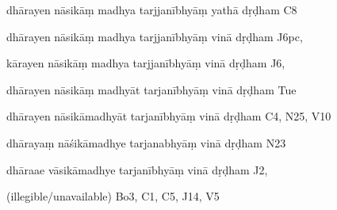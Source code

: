 \begin{ekdosis}
\begin{marma}[hp01_055]
\begin{marma}[hp02_009]
\begin{marma}[hp02_011]
\begin{marma}[hp02_65cd]
\item[dhārayen nāsikāṃ madhya tarjjanībhyāṃ yathā dṛḍham] C8
\item[dhārayen nāsikāṃ madhya tarjjanībhyāṃ vinā dṛḍham] J6pc,
\item[kārayen nāsikāṃ madhya tarjjanībhyāṃ vinā dṛḍham] J6,
\item[dhārayen nāsikāṃ madhyāt tarjanībhyāṃ vinā dṛḍham] Tue
\item[dhārayen nāsikāmadhyāt tarjanībhyāṃ vinā dṛḍham] C4, N25, V10
\item[dhārayaṃ nāśikāmadhye tarjanabhyāṃ vinā dṛḍham] N23
\item[dhāraae vāsikāmadhye tarjanībhyāṃ vinā dṛḍham] J2,
\item[(illegible/unavailable)] Bo3, C1, C5, J14, V5
 \begin{description}

        \end{description}
\end{marma}



\end{marma}
\end{marma}
\end{marma}
\end{ekdosis}
